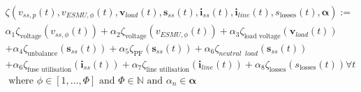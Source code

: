 \begin{multline}
	\zeta(v_{ss,p}(t), v_{ESMU,\phi}(t), \textbf{v}_{load}(t), \textbf{s}_{ss}(t), \textbf{i}_{ss}(t), \textbf{i}_{line}(t), s_\text{losses}(t), \boldsymbol{\alpha}) :=\\
	\alpha_1 \zeta_\text{voltage}(v_{ss,\phi}(t))%
	+ \alpha_2 \zeta_\text{voltage}(v_{ESMU,\phi}(t))%
	+ \alpha_3 \zeta_\text{load voltage}(\textbf{v}_{load}(t))\\
	+ \alpha_4 \zeta_\text{unbalance}(\textbf{s}_{ss}(t))%
	+ \alpha_5 \zeta_\text{PF}(\textbf{s}_{ss}(t))%
	+ \alpha_6 \zeta_{neutral\;\;load}(\textbf{s}_{ss}(t))\\
	+ \alpha_6 \zeta_\text{fuse utilisation}(\textbf{i}_{ss}(t))%
	+ \alpha_7 \zeta_\text{line utilisation}(\textbf{i}_{line}(t))%
	+ \alpha_8 \zeta_\text{losses}(s_\text{losses}(t))%
	 \forall t \\
	 \text{ where } \phi \in [1, \dots, \Phi] \text{ and } \Phi \in \mathbb{N} \text{ and } \alpha_n \in \boldsymbol{\alpha}
\label{ch1:equ:weighted-sum-cost-function}
\end{multline}